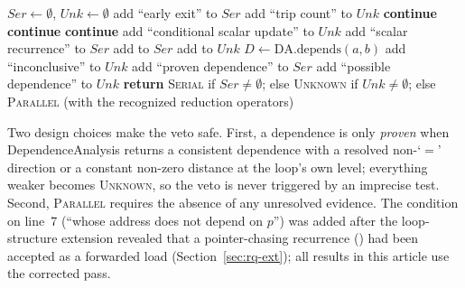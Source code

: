 \begin{algorithm}[htbp]
\caption{HF-Static classification of a loop $L$ at nesting depth $d$}
\label{alg:static}
\footnotesize
\begin{algorithmic}[1]
\STATE $\mathit{Ser} \leftarrow \emptyset$, $\mathit{Unk} \leftarrow \emptyset$
 \STATE add ``early exit'' to $\mathit{Ser}$ \ENDIF
{} \STATE add ``trip count'' to $\mathit{Unk}$ \ENDIF
{}
   \STATE \textbf{continue} \ENDIF
   \STATE \textbf{continue}  \ENDIF
   \STATE \textbf{continue} \ENDIF
   \STATE add ``conditional scalar update'' to $\mathit{Unk}$
  \ELSE \STATE add ``scalar recurrence'' to $\mathit{Ser}$ \ENDIF
\ENDFOR
{}
   \STATE add to $\mathit{Ser}$
   \STATE add to $\mathit{Unk}$ \ENDIF
\ENDFOR
{}
  \STATE $D \leftarrow \mathrm{DA.depends}(a,b)$
   \STATE add ``inconclusive'' to $\mathit{Unk}$
      \STATE add ``proven dependence'' to $\mathit{Ser}$
     \ELSE \STATE add ``possible dependence'' to $\mathit{Unk}$ \ENDIF
  \ENDIF
\ENDFOR
\STATE \textbf{return} \textsc{Serial} if $\mathit{Ser}\neq\emptyset$; else \textsc{Unknown} if $\mathit{Unk}\neq\emptyset$; else \textsc{Parallel} (with the recognized reduction operators)
\end{algorithmic}
\end{algorithm}

Two design choices make the veto safe. First, a dependence is only \emph{proven} when DependenceAnalysis returns a consistent dependence with a resolved non-`$=$' direction or a constant non-zero distance at the loop's own level; everything weaker becomes \textsc{Unknown}, so the veto is never triggered by an imprecise test. Second, \textsc{Parallel} requires the absence of any unresolved evidence. The condition on line~7 (``whose address does not depend on $p$'') was added after the loop-structure extension revealed that a pointer-chasing recurrence () had been accepted as a forwarded load (Section~\ref{sec:rq-ext}); all results in this article use the corrected pass.

